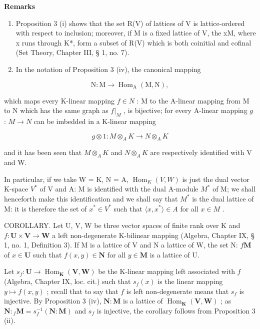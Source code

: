 \textbf{Remarks}\par

\begin{enumerate}
\def\labelenumi{(\arabic{enumi})}
\setcounter{enumi}{1}
\item
  Proposition 3 (i) shows that the set R(V) of lattices of V is lattice-ordered with respect to inclusion; moreover, if M is a fixed lattice of V, the xM, where x runs through K*, form a subset of R(V) which is both coinitial and cofinal (Set Theory, Chapter III, § 1, no. 7).
\item
  In the notation of Proposition 3 (iv), the canonical mapping
\end{enumerate}

\[
\mathrm{N}: \mathrm{M} \rightarrow \operatorname{Hom} _ {\mathrm{A}} (\mathrm{M}, \mathrm{N}),
\]

which maps every K-linear mapping \(f \in N\) : M to the A-linear mapping from M to N which has the same graph as \(f|_{M}\) , is bijective; for every A-linear mapping \(g\) : \(M \to N\) can be imbedded in a K-linear mapping

\[
g \otimes 1: M \otimes_ {A} K \rightarrow N \otimes_ {A} K
\]

and it has been seen that \(M \otimes_{A} K\) and \(N \otimes_{A} K\) are respectively identified with V and W.

In particular, if we take W = K, N = A, \(\operatorname{Hom}_{K}(V, W)\) is just the dual vector K-space \(V^{*}\) of V and A: M is identified with the dual A-module \(M^{*}\) of M; we shall henceforth make this identification and we shall say that \(M^{*}\) is the dual lattice of M: it is therefore the set of \(x^{*} \in V^{*}\) such that \(\langle x, x^{*} \rangle \in A\) for all \(x \in M\) .

COROLLARY. Let U, V, W be three vector spaces of finite rank over K and \(f: \mathbf{U} \times \mathbf{V} \to \mathbf{W}\) a left non-degenerate K-bilinear mapping (Algebra, Chapter IX, § 1, no. 1, Definition 3). If M is a lattice of V and N a lattice of W, the set N: \(f\mathbf{M}\) of \(x \in \mathbf{U}\) such that \(f(x, y) \in \mathbf{N}\) for all \(y \in \mathbf{M}\) is a lattice of U.

Let \(s_f \colon \mathbf{U} \to \operatorname{Hom}_{\mathbf{K}}(\mathbf{V}, \mathbf{W})\) be the K-linear mapping left associated with \(f\) (Algebra, Chapter IX, loc. cit.) such that \(s_f(x)\) is the linear mapping \(y \mapsto f(x, y)\) ; recall that to say that \(f\) is left non-degenerate means that \(s_f\) is injective. By Proposition 3 (iv), \(\mathbf{N} \colon \mathbf{M}\) is a lattice of \(\operatorname{Hom}_{\mathbf{K}}(\mathbf{V}, \mathbf{W})\) ; as \(\mathbf{N} \colon {}_f \mathbf{M} = s_f^{-1}(\mathbf{N} \colon \mathbf{M})\) and \(s_f\) is injective, the corollary follows from Proposition 3 (ii).

